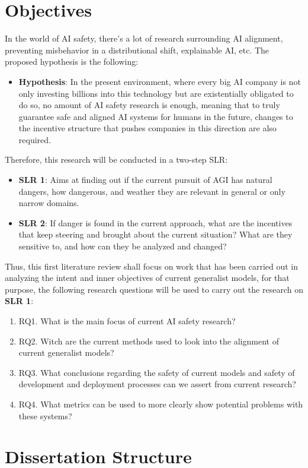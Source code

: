 \section{Objectives}

In the world of AI safety, there's a lot of research surrounding AI alignment, preventing misbehavior in a distributional shift, explainable AI, etc. The proposed hypothesis is the following:
\begin{itemize}
    \item \textbf{Hypothesis}: In the present environment, where every big AI company is not only investing billions into this technology but are existentially obligated to do so, no amount of AI safety research is enough, meaning that to truly guarantee safe and aligned AI systems for humans in the future, changes to the incentive structure that pushes companies in this direction are also required.
\end{itemize}
Therefore, this research will be conducted in a two-step SLR:
\begin{itemize}
    \item \textbf{SLR 1}: Aims at finding out if the current pursuit of AGI has natural dangers, how dangerous, and weather they are relevant in general or only narrow domains.
    \item \textbf{SLR 2}: If danger is found in the current approach, what are the incentives that keep steering and brought about the current situation? What are they sensitive to, and how can they be analyzed and changed?
\end{itemize}

Thus, this first literature review shall focus on work that has been carried out in analyzing the intent and inner objectives of current generalist models, for that purpose, the following research questions will be used to carry out the research on \textbf{SLR 1}:

\begin{enumerate}
    \item RQ1. What is the main focus of current AI safety research?  
    \item RQ2. Witch are the current methods used to look into the alignment of current generalist models?
    \item RQ3. What conclusions regarding the safety of current models and safety of development and deployment processes can we assert from current research?
    \item RQ4. What metrics can be used to more clearly show potential problems with these systems? 
\end{enumerate}

\section{Dissertation Structure}

\newpage